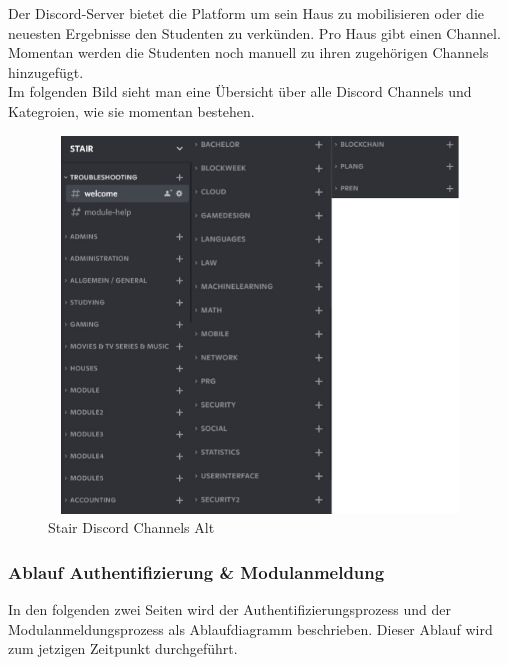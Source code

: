 \documentclass[a4paper, table]{article}
\begin{document}
Der Discord-Server bietet die Platform um sein Haus zu mobilisieren oder die neuesten Ergebnisse den Studenten zu verk\"unden.
Pro Haus gibt einen Channel. Momentan werden die Studenten noch manuell zu ihren zugeh\"origen Channels hinzugef\"ugt. \\
Im folgenden Bild sieht man eine Übersicht über alle Discord Channels und Kategroien, wie sie momentan bestehen.
\newpage
\begin{figure}[ht]
    \centering
    \includegraphics[width=1.0\textwidth,height=10cm]{img/Stair_Discord_Channels.jpg}
    \caption{Stair Discord Channels Alt}
    \label{fig:stair_old_discord_channels}
\end{figure}

\subsubsection*{Ablauf Authentifizierung \& Modulanmeldung}
In den folgenden zwei Seiten wird der Authentifizierungsprozess und der Modulanmeldungsprozess als Ablaufdiagramm beschrieben.
Dieser Ablauf wird zum jetzigen Zeitpunkt durchgeführt.
\end{document}
